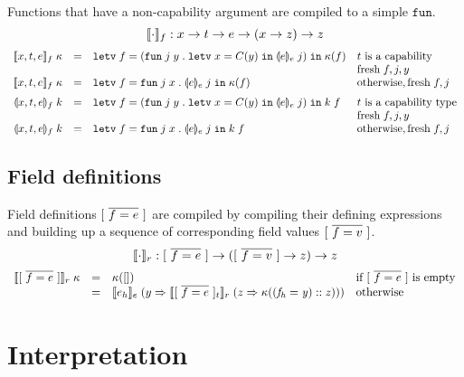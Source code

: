 \documentclass[11pt]{article}
\newcommand{\kw}[1]{\mathtt{#1}}
\begin{document}
Functions that have a non-capability argument are compiled to a simple $\kw{fun}$.
\[
    \cmpn{f} : x -> t -> e -> (x -> z) -> z
\]
\[
\begin{array}{rclll}
\cmpk{f}{x, t, e} & = &
  \letv{f}{(\funv{j}{y}{\letv{x}{\prmv{C}{y}}{\tcmpin{e}{e}{j}}})}{\kappa(f)} &
  \text{$t$ is a capability} \\
  & & &  \fresh{f, j, y} \\
\cmpk{f}{x, t, e} & = &
  \letv{f}{\funv{j}{x}{\tcmpin{e}{e}{j}}}{\kappa(f)} & \text{otherwise}, \fresh{f, j} \medskip \\

\tcmpk{f}{x, t, e} & = &
  \letv{f}{(\funv{j}{y}{\letv{x}{\prmv{C}{y}}{\tcmpin{e}{e}{j}}})}{\appc{k}{f}} &
  \text{$t$ is a capability type} \\
  & & &  \fresh{f, j, y} \\
\tcmpk{f}{x, t, e} & = &
  \letv{f}{\funv{j}{x}{\tcmpin{e}{e}{j}}}{\appc{k}{f}} & \text{otherwise}, \fresh{f, j}
\end{array}
\]

\subsection*{Field definitions}

Field definitions $\flds{f}{e}$ are compiled by compiling their defining expressions and building up a sequence of corresponding field values $\flds{f}{v}$.
\[
    \cmpn{r} : \flds{f}{e} -> (\flds{f}{v} -> z) -> z
\]
\[
\begin{array}{rcll}
\cmpk{r}{\flds{f}{e}}
  & = & \kappa([]) & \text{if $\flds{f}{e}$ is empty} \\
  & = & \cmpin{e}{e_h}{(y =>
          \cmpin{r}{\flds{f}{e}_t}{(z =>
            \kappa(\cons{(\flde{f_h}{y})}{z}))})}
      & \text{otherwise} \\
\end{array}
\]

\newpage

\section{Interpretation}

\newcommand{\interp}[2]{#1 |- #2 \Downarrow}

\newcommand{\conf}[3]{\lambda #1 #2 . #3}
\newcommand{\conc}[2]{\lambda #1 . #2}

\newcommand{\clsf}[4]{\langle #1, \conf{#2}{#3}{#4} \rangle}
\newcommand{\clsc}[3]{\langle #1, \conc{#2}{#3} \rangle}
\newcommand{\clsfs}[5]{\langle #1, \repo{\lambda #2 #3 #4 . #5} \rangle}
\newcommand{\clsffs}[2]{\langle #1, \repo{#2} \rangle}
\end{document}
